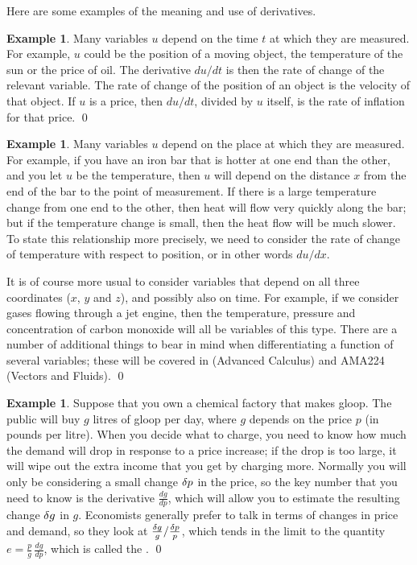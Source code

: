 \documentclass[a4paper]{book}
\theoremstyle{definition}
\newtheorem{example}[theorem]{Example}
\begin{document}
Here are some examples of the meaning and use of derivatives.
\begin{example}
 Many variables $u$ depend on the time $t$ at which they are measured.
 For example, $u$ could be the position of a moving object, the
 temperature of the sun or the price of oil.  The derivative $du/dt$
 is then the rate of change of the relevant variable.  The rate of
 change of the position of an object is the velocity of that object.
 If $u$ is a price, then $du/dt$, divided by $u$ itself, is the rate
 of inflation for that price. \qed
\end{example}
\begin{example}
 Many variables $u$ depend on the place at which they are measured.
 For example, if you have an iron bar that is hotter at one end than
 the other, and you let $u$ be the temperature, then $u$ will depend
 on the distance $x$ from the end of the bar to the point of
 measurement.  If there is a large temperature change from one end to
 the other, then heat will flow very quickly along the bar; but if the
 temperature change is small, then the heat flow will be much slower.
 To state this relationship more precisely, we need to consider the
 rate of change of temperature with respect to position, or in other
 words $du/dx$.  

 It is of course more usual to consider variables that depend on all
 three coordinates ($x$, $y$ and $z$), and possibly also on time.  For
 example, if we consider gases flowing through a jet engine, then the
 temperature, pressure and concentration of carbon monoxide will all
 be variables of this type.  There are a number of additional things
 to bear in mind when differentiating a function of several variables;
 these will be covered in  (Advanced Calculus) and AMA224
 (Vectors and Fluids). \qed
\end{example}
\begin{example}
 Suppose that you own a chemical factory that makes gloop.  The public
 will buy $g$ litres of gloop per day, where $g$ depends on the price
 $p$ (in pounds per litre).  When you decide what to charge, you need
 to know how much the demand will drop in response to a price
 increase; if the drop is too large, it will wipe out the extra income
 that you get by charging more.  Normally you will only be considering
 a small change $\delta p$ in the price, so the key number that you need
 to know is the derivative $\frac{dg}{dp}$, which will allow you to
 estimate the resulting change $\delta g$ in $g$.  Economists generally
 prefer to talk in terms of  changes in price and
 demand, so they look at $\frac{\delta g}{g}/\frac{\delta p}{p}$, which
 tends in the limit to the quantity $e=\frac{p}{g}\,\frac{dg}{dp}$,
 which is called the .
 \qed
\end{example}
\end{document}
